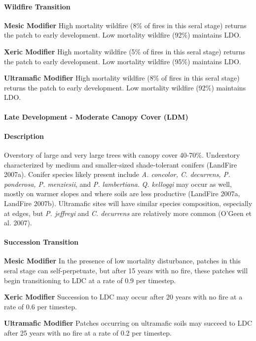 \paragraph{Wildfire Transition}
\begin{adjustwidth}{2cm}{}
\textbf{Mesic Modifier } High mortality wildfire (8\% of fires in this seral stage) returns the patch to early development. Low mortality wildfire (92\%) maintains LDO.

\medskip
\noindent \textbf{Xeric Modifier} High mortality wildfire (5\% of fires in this seral stage) returns the patch to early development. Low mortality wildfire (95\%) maintains LDO. 

\medskip
\noindent \textbf{Ultramafic Modifier} High mortality wildfire (8\% of fires in this seral stage) returns the patch to early development. Low mortality wildfire (92\%) maintains LDO.

\end{adjustwidth}

\noindent\hrulefill

\paragraph{Late Development - Moderate Canopy Cover (LDM)}

\paragraph{Description} Overstory of large and very large trees with canopy cover 40-70\%. Understory characterized by medium and smaller-sized shade-tolerant conifers (LandFire 2007a). Conifer species likely present include \emph{A. concolor, C. decurrens, P. ponderosa, P. menziesii}, and \emph{P. lambertiana}. \emph{Q. kelloggi} may occur as well, mostly on warmer slopes and where soils are less productive (LandFire 2007a, LandFire 2007b). Ultramafic sites will have similar species composition, especially at edges, but \emph{P. jeffreyi} and \emph{C. decurrens} are relatively more common (O'Geen et al. 2007).


\paragraph{Succession Transition} 
\begin{adjustwidth}{2cm}{}
\textbf{Mesic Modifier } In the presence of low mortality disturbance, patches in this seral stage can self-perpetuate, but after 15 years with no fire, these patches will begin transitioning to LDC at a rate of 0.9 per timestep.

\medskip
\noindent \textbf{Xeric Modifier} Succession to LDC may occur after 20 years with no fire at a rate of 0.6 per timestep. 

\medskip
\noindent \textbf{Ultramafic Modifier} Patches occurring on ultramafic soils may succeed to LDC after 25 years with no fire at a rate of 0.2 per timestep.

\end{adjustwidth}
